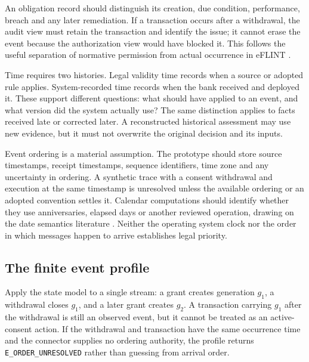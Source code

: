 
An obligation record should distinguish its creation, due condition, performance,
breach and any later remediation. If a transaction occurs after a withdrawal, the
audit view must retain the transaction and identify the issue; it cannot erase
the event because the authorization view would have blocked it. This follows the
useful separation of normative permission from actual occurrence in eFLINT
\citep{eflint2026}.

Time requires two histories. Legal validity time records when a source or adopted
rule applies. System-recorded time records when the bank received and deployed
it. These support different questions: what should have applied to an event, and
what version did the system actually use? The same distinction applies to facts
received late or corrected later. A reconstructed historical assessment may use
new evidence, but it must not overwrite the original decision and its inputs.

Event ordering is a material assumption. The prototype should store source
timestamps, receipt timestamps, sequence identifiers, time zone and any uncertainty
in ordering. A synthetic trace with a consent withdrawal and execution at the
same timestamp is unresolved unless the available ordering or an adopted
convention settles it. Calendar computations should identify whether they use
anniversaries, elapsed days or another reviewed operation, drawing on the date
semantics literature \citep{dates2024}. Neither the operating system clock nor the
order in which messages happen to arrive establishes legal priority.

\subsection{The finite event profile}
\label{merge:P-03b-event-contract:00}


Apply the state model to a single stream: a grant creates generation $g_1$,
a withdrawal closes $g_1$, and a later grant creates $g_2$. A transaction carrying
$g_1$ after the withdrawal is still an observed event, but it cannot be treated as
an active-consent action. If the withdrawal and transaction have the same
occurrence time and the connector supplies no ordering authority, the profile
returns \texttt{E\_ORDER\_UNRESOLVED} rather than guessing from arrival order.

